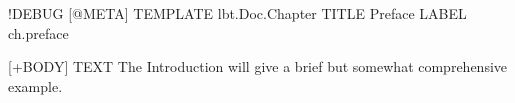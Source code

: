 \begin{lbt}
  !DEBUG
  [@META]
    TEMPLATE lbt.Doc.Chapter
    TITLE Preface
    LABEL ch.preface

  [+BODY]
    TEXT The Introduction will give a brief but somewhat comprehensive example.
  
\end{lbt}

